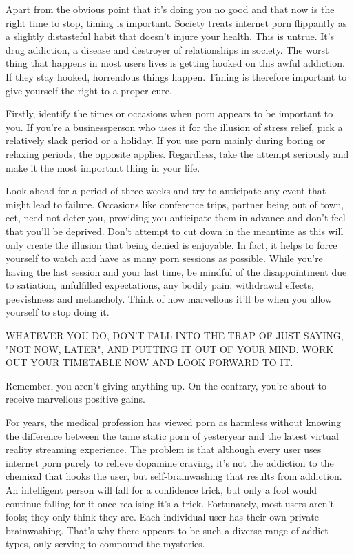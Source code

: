 \documentclass[easypeasy.tex]{subfiles}
\begin{document}
Apart from the obvious point that it's doing you no good and that now is the right time to stop, timing is important. Society treats internet porn flippantly as a slightly distasteful habit that doesn't injure your health. This is untrue. It's drug addiction, a disease and destroyer of relationships in society. The worst thing that happens in most users lives is getting hooked on this awful addiction. If they stay hooked, horrendous things happen. Timing is therefore important to give yourself the right to a proper cure.

Firstly, identify the times or occasions when porn appears to be important to you. If you're a businessperson who uses it for the illusion of stress relief, pick a relatively slack period or a holiday. If you use porn mainly during boring or relaxing periods, the opposite applies. Regardless, take the attempt seriously and make it the most important thing in your life.

Look ahead for a period of three weeks and try to anticipate any event that might lead to failure. Occasions like conference trips, partner being out of town, ect, need not deter you, providing you anticipate them in advance and don't feel that you'll be deprived. Don't attempt to cut down in the meantime as this will only create the illusion that being denied is enjoyable. In fact, it helps to force yourself to watch and have as many porn sessions as possible. While you're having the last session and your last time, be mindful of the disappointment due to satiation, unfulfilled expectations, any bodily pain, withdrawal effects, peevishness and melancholy. Think of how marvellous it'll be when you allow yourself to stop doing it.

{\large WHATEVER YOU DO, DON'T FALL INTO THE TRAP OF JUST SAYING, "NOT NOW, LATER", AND PUTTING IT OUT OF YOUR MIND. WORK OUT YOUR TIMETABLE NOW AND LOOK FORWARD TO IT.}

Remember, you aren't giving anything up. On the contrary, you're about to receive marvellous positive gains.

For years, the medical profession has viewed porn as harmless without knowing the difference between the tame static porn of yesteryear and the latest virtual reality streaming experience. The problem is that although every user uses internet porn purely to relieve dopamine craving, it's not the addiction to the chemical that hooks the user, but self-brainwashing that results from addiction. An intelligent person will fall for a confidence trick, but only a fool would continue falling for it once realising it's a trick. Fortunately, most users aren't fools; they only think they are. Each individual user has their own private brainwashing. That's why there appears to be such a diverse range of addict types, only serving to compound the mysteries.
\end{document}
